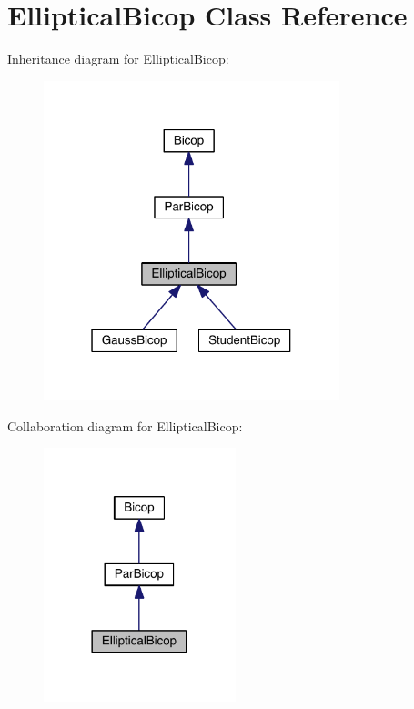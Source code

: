 \hypertarget{class_elliptical_bicop}{}\section{Elliptical\+Bicop Class Reference}
\label{class_elliptical_bicop}


Inheritance diagram for Elliptical\+Bicop\+:
\nopagebreak
\begin{figure}[H]
\begin{center}
\leavevmode
\includegraphics[width=244pt]{class_elliptical_bicop__inherit__graph}
\end{center}
\end{figure}


Collaboration diagram for Elliptical\+Bicop\+:
\nopagebreak
\begin{figure}[H]
\begin{center}
\leavevmode
\includegraphics[width=158pt]{class_elliptical_bicop__coll__graph}
\end{center}
\end{figure}
